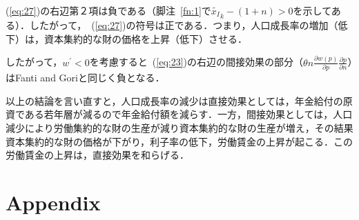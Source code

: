 \documentclass[12pt,a4paper]{jsarticle}
\begin{document}
(\ref{eq:27})の右辺第２項は負である（脚注~\ref{fn:1}で$\tilde{x_{I}}_{k} - (1+n) >0$を示してある）．したがって，~(\ref{eq:27})の符号は正である．つまり，人口成長率の増加（低下）は，資本集約的な財の価格を上昇（低下）させる．

したがって，$w^{\prime}<0$を考慮すると~(\ref{eq:23})の右辺の間接効果の部分（$\theta n \frac{\partial w(p)}{\partial p} \frac{\partial p}{\partial n}$）はFanti and Goriと同じく負となる．

以上の結論を言い直すと，人口成長率の減少は直接効果としては，年金給付の原資である若年層が減るので年金給付額を減らす．一方，間接効果としては，人口減少により労働集約的な財の生産が減り資本集約的な財の生産が増え，その結果資本集約的な財の価格が下がり，利子率の低下，労働賃金の上昇が起こる．この労働賃金の上昇は，直接効果を和らげる．



\section{Appendix}
\end{document}
